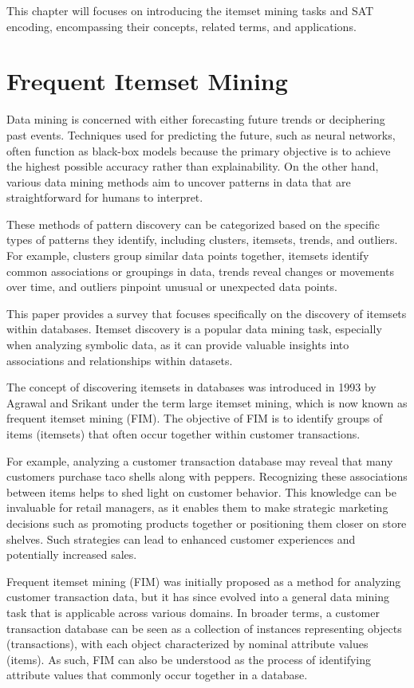 This chapter will focuses on introducing the itemset mining tasks and SAT encoding, encompassing their concepts, related terms, and applications.
\section{Frequent Itemset Mining}

Data mining\cite{survey_itemset_mining} is concerned with either forecasting future trends or deciphering past events. Techniques used for predicting the future, such as neural networks, often function as black-box models because the primary objective is to achieve the highest possible accuracy rather than explainability. On the other hand, various data mining methods aim to uncover patterns in data that are straightforward for humans to interpret.

These methods of pattern discovery can be categorized based on the specific types of patterns they identify, including clusters, itemsets, trends, and outliers. For example, clusters group similar data points together, itemsets identify common associations or groupings in data, trends reveal changes or movements over time, and outliers pinpoint unusual or unexpected data points.

This paper provides a survey that focuses specifically on the discovery of itemsets within databases. Itemset discovery is a popular data mining task, especially when analyzing symbolic data, as it can provide valuable insights into associations and relationships within datasets.

The concept of discovering itemsets in databases was introduced in 1993 by Agrawal and Srikant under the term large itemset mining, which is now known as frequent itemset mining (FIM). The objective of FIM is to identify groups of items (itemsets) that often occur together within customer transactions.

For example, analyzing a customer transaction database may reveal that many customers purchase taco shells along with peppers. Recognizing these associations between items helps to shed light on customer behavior. This knowledge can be invaluable for retail managers, as it enables them to make strategic marketing decisions such as promoting products together or positioning them closer on store shelves. Such strategies can lead to enhanced customer experiences and potentially increased sales.

Frequent itemset mining (FIM) was initially proposed as a method for analyzing customer transaction data, but it has since evolved into a general data mining task that is applicable across various domains. In broader terms, a customer transaction database can be seen as a collection of instances representing objects (transactions), with each object characterized by nominal attribute values (items). As such, FIM can also be understood as the process of identifying attribute values that commonly occur together in a database.


